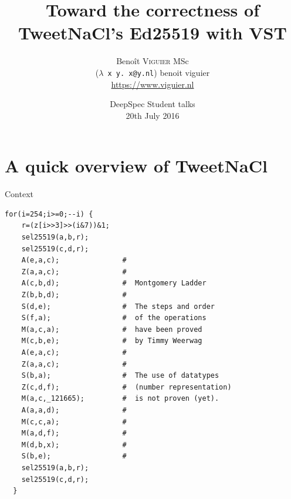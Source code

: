 \documentclass[8pt]{beamer}
\title{Toward the correctness of TweetNaCl's Ed25519 with VST}
\author[Beno\^{i}t \textsc{Viguier} MSc]{
  \normalsize Beno\^{i}t \textsc{Viguier} MSc \\
  {\small (\texttt{$\lambda$ x y. x@y.nl}) benoit viguier} \\
  {\small \url{https://www.viguier.nl}}\\ \medskip}
\institute[Radboud University Nijmegen]{
  Institute for Computing and Information Sciences -- Digital Security \\
  Radboud University Nijmegen}
\date[20, Jul. 2016]{
  DeepSpec Student talks \\
  20th July 2016}
\begin{document}
%
%

\begin{frame}
\titlepage
\end{frame}

%
%


\section{A quick overview of TweetNaCl}
%
%
\begin{frame}[fragile]{Context}
  \begin{center}

\begin{lstlisting}[language=cnacl, caption=crypto\_scalarmult, label=cod:languageC11]
  for(i=254;i>=0;--i) {
    r=(z[i>>3]>>(i&7))&1;
    sel25519(a,b,r);
    sel25519(c,d,r);
    A(e,a,c);               #
    Z(a,a,c);               #
    A(c,b,d);               #  Montgomery Ladder
    Z(b,b,d);               #
    S(d,e);                 #  The steps and order
    S(f,a);                 #  of the operations
    M(a,c,a);               #  have been proved
    M(c,b,e);               #  by Timmy Weerwag
    A(e,a,c);               #
    Z(a,a,c);               #
    S(b,a);                 #  The use of datatypes
    Z(c,d,f);               #  (number representation)
    M(a,c,_121665);         #  is not proven (yet).
    A(a,a,d);               #
    M(c,c,a);               #
    M(a,d,f);               #
    M(d,b,x);               #
    S(b,e);                 #
    sel25519(a,b,r);
    sel25519(c,d,r);
  }
\end{lstlisting}

  \end{center}
\end{frame}
\end{document}

